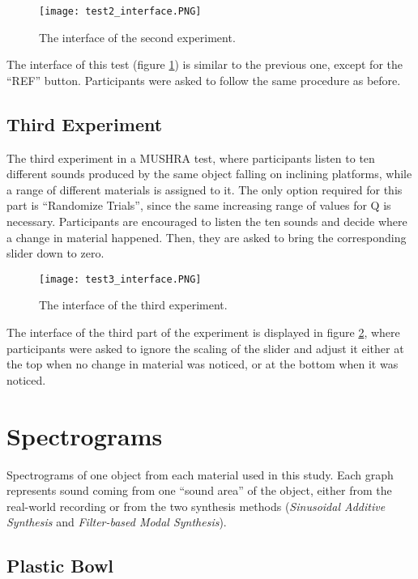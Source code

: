 \begin{figure}[H]
    \centering  
     \texttt{[image: test2\_interface.PNG]}
        \caption{The interface of the second experiment.}
        \label{fig:t2_ui}
\end{figure}

The interface of this test (figure \ref{fig:t2_ui}) is similar to the previous one, except for the ``REF'' button. Participants were asked to follow the same procedure as before.

\section*{Third Experiment}
The third experiment in a \gls{MUSHRA} test, where participants listen to ten different sounds produced by the same object falling on inclining platforms, while a range of different materials is assigned to it. The only option required for this part is ``Randomize Trials'', since the same increasing range of values for \gls{Q} is necessary. Participants are encouraged to listen the ten sounds and decide where a change in material happened. Then, they are asked to bring the corresponding slider down to zero.

\begin{figure}[H]
    \centering  
     \texttt{[image: test3\_interface.PNG]}
        \caption{The interface of the third experiment.}
        \label{fig:t3_ui}
\end{figure}

The interface of the third part of the experiment is displayed in figure \ref{fig:t3_ui}, where participants were asked to ignore the scaling of the slider and adjust it either at the top when no change in material was noticed, or at the bottom when it was noticed.

\chapter{Spectrograms}\label{ap:spectrograms}
Spectrograms of one object from each material used in this study. Each graph represents sound coming from one ``sound area'' of the object, either from the real-world recording or from the two synthesis methods (\textit{Sinusoidal Additive Synthesis} and \textit{Filter-based Modal Synthesis}).
\section*{Plastic Bowl}

